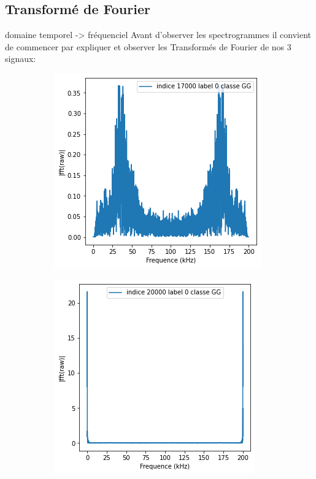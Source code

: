 \hypertarget{Transformuxe9-de-Fourier}{%
\subsection{Transformé de Fourier}
\label{Transformuxe9-de-Fourier}}
domaine temporel -> fréquenciel
Avant d'observer les spectrogrammes il convient de commencer par expliquer et observer les Transformés de Fourier de nos 3 signaux:
\begin{figure}[!h]
\centering
  \begin{subfigure}[b]{0.3\textwidth}
    \includegraphics[width=\textwidth]{./images/17000fft.png}
  \end{subfigure}
  \begin{subfigure}[b]{0.3\textwidth}
    \includegraphics[width=\textwidth]{./images/20000fft.png}

\end{subfigure}
\end{figure}
